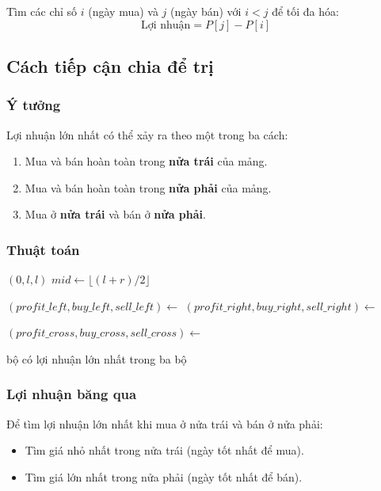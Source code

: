 \documentclass{article}
\begin{document}
Tìm các chỉ số \(i\) (ngày mua) và \(j\) (ngày bán) với \(i < j\) để tối đa hóa:
\[
\text{Lợi nhuận} = P[j] - P[i]
\]

\subsection{Cách tiếp cận chia để trị}

\subsubsection{Ý tưởng}
Lợi nhuận lớn nhất có thể xảy ra theo một trong ba cách:
\begin{enumerate}
    \item Mua và bán hoàn toàn trong \textbf{nửa trái} của mảng.
    \item Mua và bán hoàn toàn trong \textbf{nửa phải} của mảng.
    \item Mua ở \textbf{nửa trái} và bán ở \textbf{nửa phải}.
\end{enumerate}

\subsubsection{Thuật toán}

\begin{algorithmic}[1]
        \State \Return $(0, l, l)$ 
    \EndIf
    \State $mid \gets \lfloor (l + r)/2 \rfloor$
    
    \State $(profit\_left, buy\_left, sell\_left) \gets$ 
    \State $(profit\_right, buy\_right, sell\_right) \gets$ 
    
    \State $(profit\_cross, buy\_cross, sell\_cross) \gets$ 
    
    \State \Return bộ có lợi nhuận lớn nhất trong ba bộ
\EndFunction
\end{algorithmic}

\subsubsection{Lợi nhuận băng qua}

Để tìm lợi nhuận lớn nhất khi mua ở nửa trái và bán ở nửa phải:
\begin{itemize}
    \item Tìm giá nhỏ nhất trong nửa trái (ngày tốt nhất để mua).
    \item Tìm giá lớn nhất trong nửa phải (ngày tốt nhất để bán).
\end{itemize}
\end{document}
